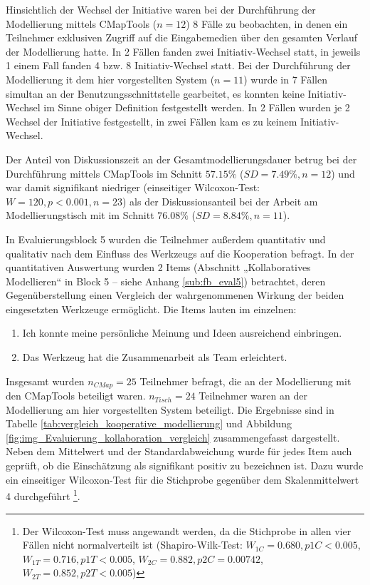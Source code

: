 Hinsichtlich der Wechsel der Initiative waren bei der Durchführung der Modellierung mittels CMapTools ($n=12$) 8 Fälle zu beobachten, in denen ein Teilnehmer exklusiven Zugriff auf die Eingabemedien über den gesamten Verlauf der Modellierung hatte. In 2 Fällen fanden zwei Initiativ-Wechsel statt, in jeweils 1 einem Fall fanden 4 bzw. 8 Initiativ-Wechsel statt. Bei der Durchführung der Modellierung it dem hier vorgestellten System ($n=11$) wurde in 7 Fällen simultan an der Benutzungsschnittstelle gearbeitet, es konnten keine Initiativ-Wechsel im Sinne obiger Definition festgestellt werden. In 2 Fällen wurden je 2 Wechsel der Initiative festgestellt, in zwei Fällen kam es zu keinem Initiativ-Wechsel.

Der Anteil von Diskussionszeit an der Gesamtmodellierungsdauer betrug bei der Durchführung mittels CMapTools im Schnitt $57.15\%$ ($SD=7.49\%, n=12$) und war damit signifikant niedriger (einseitiger Wilcoxon-Test: $W=120, p<0.001, n=23$) als der Diskussionsanteil bei der Arbeit am Modellierungstisch mit im Schnitt $76.08\%$ ($SD=8.84\%, n=11$).

In Evaluierungsblock 5 wurden die Teilnehmer außerdem quantitativ und qualitativ nach dem Einfluss des Werkzeugs auf die Kooperation befragt. In der quantitativen Auswertung wurden 2 Items (Abschnitt „Kollaboratives Modellieren“ in Block 5 -- siehe Anhang \ref{sub:fb_eval5}) betrachtet, deren Gegenüberstellung einen Vergleich der wahrgenommenen Wirkung der beiden eingesetzten Werkzeuge ermöglicht. Die Items lauten im einzelnen:

\begin{enumerate}
	\item Ich konnte meine persönliche Meinung und Ideen ausreichend einbringen.
	\item Das Werkzeug hat die Zusammenarbeit als Team erleichtert.
\end{enumerate}

Insgesamt wurden $n_{CMap}=25$ Teilnehmer befragt, die an der Modellierung mit den CMapTools beteiligt waren. $n_{Tisch}=24$ Teilnehmer waren an der Modellierung am hier vorgestellten System beteiligt. Die Ergebnisse sind in Tabelle \ref{tab:vergleich_kooperative_modellierung} und Abbildung \ref{fig:img_Evaluierung_kollaboration_vergleich} zusammengefasst dargestellt. Neben dem Mittelwert und der Standardabweichung wurde für jedes Item auch geprüft, ob die Einschätzung als signifikant positiv zu bezeichnen ist. Dazu wurde ein einseitiger Wilcoxon-Test für die Stichprobe gegenüber dem Skalenmittelwert 4 durchgeführt \footnote{Der Wilcoxon-Test muss angewandt werden, da die Stichprobe in allen vier Fällen nicht normalverteilt ist (Shapiro-Wilk-Test: $W_{1C}=0.680, p{1C}<0.005$, $W_{1T}=0.716, p{1T}<0.005$, $W_{2C}=0.882, p{2C}=0.00742$, $W_{2T}=0.852, p{2T}<0.005$)}.

